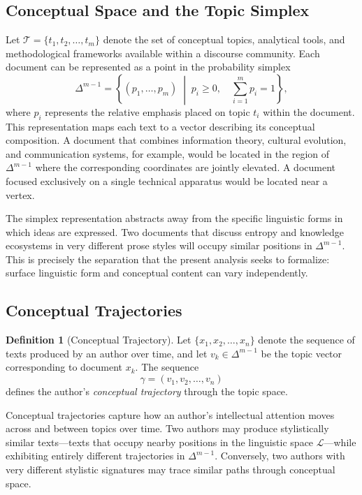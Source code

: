 \documentclass[12pt,a4paper]{article}
\theoremstyle{definition}
\newtheorem{definition}{Definition}[section]
\theoremstyle{plain}
\theoremstyle{remark}
\newcommand{\calL}{\mathcal{L}}
\newcommand{\calT}{\mathcal{T}}
\begin{document}
\subsection{Conceptual Space and the Topic Simplex}

Let $\calT = \{t_1, t_2, \ldots, t_m\}$ denote the set of conceptual topics, analytical
tools, and methodological frameworks available within a discourse community. Each document
can be represented as a point in the probability simplex
\[
\Delta^{m-1} = \left\{ (p_1, \ldots, p_m) \;\middle|\; p_i \ge 0, \quad
\sum_{i=1}^m p_i = 1 \right\},
\]
where $p_i$ represents the relative emphasis placed on topic $t_i$ within the document. This
representation maps each text to a vector describing its conceptual composition. A document
that combines information theory, cultural evolution, and communication systems, for example,
would be located in the region of $\Delta^{m-1}$ where the corresponding coordinates are
jointly elevated. A document focused exclusively on a single technical apparatus would be
located near a vertex.

The simplex representation abstracts away from the specific linguistic forms in which ideas
are expressed. Two documents that discuss entropy and knowledge ecosystems in very different
prose styles will occupy similar positions in $\Delta^{m-1}$. This is precisely the
separation that the present analysis seeks to formalize: surface linguistic form and
conceptual content can vary independently.

\subsection{Conceptual Trajectories}

\begin{definition}[Conceptual Trajectory]
Let $\{x_1, x_2, \ldots, x_n\}$ denote the sequence of texts produced by an author over
time, and let $v_k \in \Delta^{m-1}$ be the topic vector corresponding to document $x_k$.
The sequence
\[
\gamma = (v_1, v_2, \ldots, v_n)
\]
defines the author's \emph{conceptual trajectory} through the topic space.
\end{definition}

Conceptual trajectories capture how an author's intellectual attention moves across and
between topics over time. Two authors may produce stylistically similar texts---texts that
occupy nearby positions in the linguistic space $\calL$---while exhibiting entirely different
trajectories in $\Delta^{m-1}$. Conversely, two authors with very different stylistic
signatures may trace similar paths through conceptual space.
\end{document}
